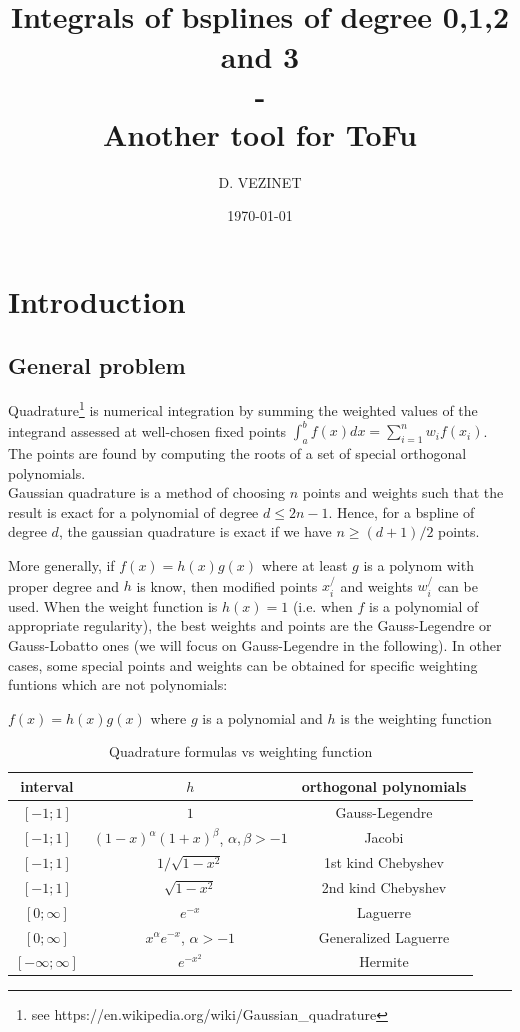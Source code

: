 \documentclass[paper=a4, fontsize=11pt]{book}
\title{
		\usefont{OT1}{bch}{b}{n}
		\horrule{0.5pt} \\[0.2cm]
		\LARGE Integrals of bsplines of degree 0,1,2 and 3\\
        -\\
        \normalsize Another tool for ToFu
		\horrule{2pt} \\[0.3cm]
}
\author{D. VEZINET}
\date{\today}
\numberwithin{equation}{section}		%
\numberwithin{figure}{section}			%
\numberwithin{table}{section}				%
\begin{document}
\maketitle

\tableofcontents

\newpage
\section{Introduction}

\subsection{General problem}

Quadrature\footnote{see https://en.wikipedia.org/wiki/Gaussian\_quadrature} is numerical integration by summing the weighted values of the integrand assessed at well-chosen fixed points $\int_a^b f(x)dx = \sum_{i=1}^n w_if(x_i)$.
The points are found by computing the roots of a set of special orthogonal polynomials.\\

Gaussian quadrature is a method of choosing $n$ points and weights such that the result is exact for a polynomial of degree $d \leq 2n-1$.
Hence, for a bspline of degree $d$, the gaussian quadrature is exact if we have $n \geq (d+1)/2$ points.

More generally, if $f(x)=h(x)g(x)$ where at least $g$ is a polynom with proper degree and $h$ is know, then modified points $x_i^/$ and weights $w_i^/$ can be used.
When the weight function is $h(x)=1$ (i.e. when $f$ is a polynomial of appropriate regularity), the best weights and points are the Gauss-Legendre or Gauss-Lobatto ones (we will focus on Gauss-Legendre in the following).
In other cases, some special points and weights can be obtained for specific weighting funtions which are not polynomials:


\begin{table}[hbtp]
\caption{\label{Tab:11Form}Quadrature formulas vs weighting function}
\centering
\scriptsize $f(x)=h(x)g(x)$ where $g$ is a polynomial and $h$ is the weighting function
\centering
\begin{tabular}{@{}ccc}
\hline
interval & $h$ & orthogonal polynomials\\
\hline
$[-1;1]$ & $1$ & Gauss-Legendre \\
$[-1;1]$ & $(1-x)^{\alpha}(1+x)^{\beta}$, $\alpha,\beta>-1$ & Jacobi \\
$[-1;1]$ & $1/\sqrt{1-x^2}$ & 1st kind Chebyshev \\
$[-1;1]$ & $\sqrt{1-x^2}$ & 2nd kind Chebyshev \\
$[0;\infty]$ & $e^{-x}$ & Laguerre \\
$[0;\infty]$ & $x^{\alpha}e^{-x}$, $\alpha>-1$ & Generalized Laguerre \\
$[-\infty;\infty]$ & $e^{-x^2}$ & Hermite \\
\hline
\end{tabular}
\end{table}
\end{document}

